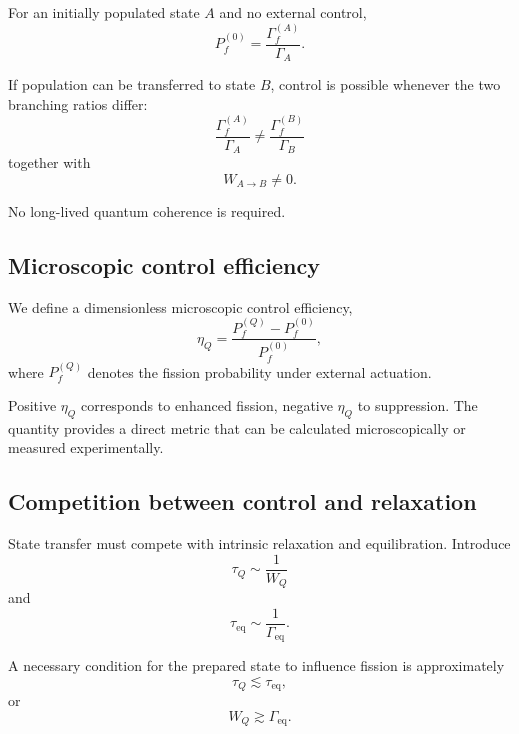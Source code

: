 For an initially populated state $A$ and no external control,
\begin{equation}
P_f^{(0)}
=
\frac{\Gamma_f^{(A)}}{\Gamma_A}.
\end{equation}

If population can be transferred to state $B$, control is possible whenever the two branching ratios differ:
\begin{equation}
\boxed{
\frac{\Gamma_f^{(A)}}{\Gamma_A}
\neq
\frac{\Gamma_f^{(B)}}{\Gamma_B}
}
\end{equation}
together with
\begin{equation}
\boxed{
W_{A\rightarrow B}\neq0.
}
\end{equation}

No long-lived quantum coherence is required.

\subsection{Microscopic control efficiency}

We define a dimensionless microscopic control efficiency,
\begin{equation}
\eta_Q
=
\frac{P_f^{(Q)}-P_f^{(0)}}{P_f^{(0)}},
\end{equation}
where $P_f^{(Q)}$ denotes the fission probability under external actuation.

Positive $\eta_Q$ corresponds to enhanced fission, negative $\eta_Q$ to suppression. The quantity provides a direct metric that can be calculated microscopically or measured experimentally.

\subsection{Competition between control and relaxation}

State transfer must compete with intrinsic relaxation and equilibration. Introduce
\begin{equation}
\tau_Q\sim\frac{1}{W_Q}
\end{equation}
and
\begin{equation}
\tau_{\mathrm{eq}}
\sim
\frac{1}{\Gamma_{\mathrm{eq}}}.
\end{equation}

A necessary condition for the prepared state to influence fission is approximately
\begin{equation}
\tau_Q
\lesssim
\tau_{\mathrm{eq}},
\end{equation}
or
\begin{equation}
W_Q
\gtrsim
\Gamma_{\mathrm{eq}}.
\end{equation}

